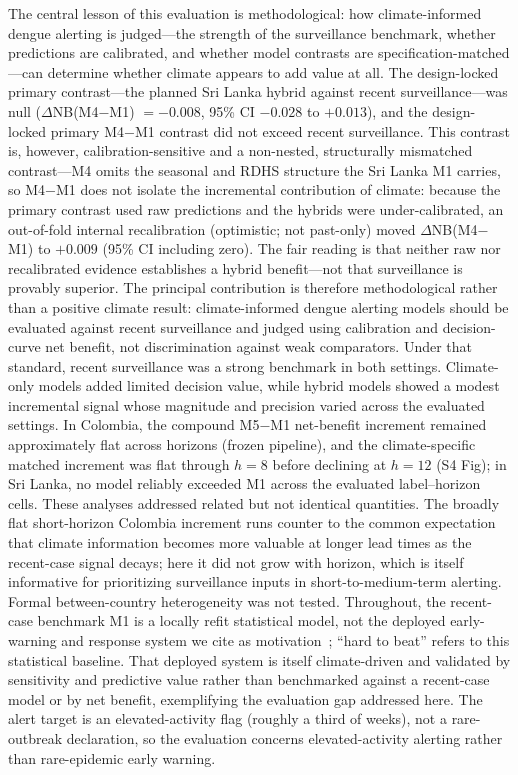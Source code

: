 \documentclass[11pt,a4paper]{article}
\begin{document}
The central lesson of this evaluation is methodological: how climate-informed dengue alerting is judged---the strength of the surveillance benchmark, whether predictions are calibrated, and whether model contrasts are specification-matched---can determine whether climate appears to add value at all. The design-locked primary contrast---the planned Sri Lanka hybrid against recent surveillance---was null ($\Delta$NB(M4$-$M1) $=-0.008$, 95\% CI $-0.028$ to $+0.013$), and the design-locked primary M4$-$M1 contrast did not exceed recent surveillance. This contrast is, however, calibration-sensitive and a non-nested, structurally mismatched contrast---M4 omits the seasonal and RDHS structure the Sri Lanka M1 carries, so M4$-$M1 does not isolate the incremental contribution of climate: because the primary contrast used raw predictions and the hybrids were under-calibrated, an out-of-fold internal recalibration (optimistic; not past-only) moved $\Delta$NB(M4$-$M1) to $+0.009$ (95\% CI including zero). The fair reading is that neither raw nor recalibrated evidence establishes a hybrid benefit---not that surveillance is provably superior. The principal contribution is therefore methodological rather than a positive climate result: climate-informed dengue alerting models should be evaluated against recent surveillance and judged using calibration and decision-curve net benefit, not discrimination against weak comparators. Under that standard, recent surveillance was a strong benchmark in both settings. Climate-only models added limited decision value, while hybrid models showed a modest incremental signal whose magnitude and precision varied across the evaluated settings. In Colombia, the compound M5$-$M1 net-benefit increment remained approximately flat across horizons (frozen pipeline), and the climate-specific matched increment was flat through $h=8$ before declining at $h=12$ (S4 Fig); in Sri Lanka, no model reliably exceeded M1 across the evaluated label--horizon cells. These analyses addressed related but not identical quantities. The broadly flat short-horizon Colombia increment runs counter to the common expectation that climate information becomes more valuable at longer lead times as the recent-case signal decays; here it did not grow with horizon, which is itself informative for prioritizing surveillance inputs in short-to-medium-term alerting. Formal between-country heterogeneity was not tested. Throughout, the recent-case benchmark M1 is a locally refit statistical model, not the deployed early-warning and response system we cite as motivation~\cite{EWARScsd}; ``hard to beat'' refers to this statistical baseline. That deployed system is itself climate-driven and validated by sensitivity and predictive value rather than benchmarked against a recent-case model or by net benefit, exemplifying the evaluation gap addressed here. The alert target is an elevated-activity flag (roughly a third of weeks), not a rare-outbreak declaration, so the evaluation concerns elevated-activity alerting rather than rare-epidemic early warning.
\end{document}
